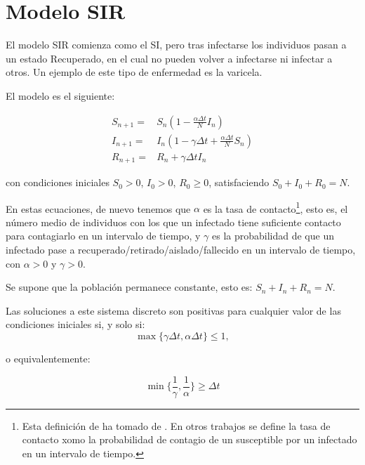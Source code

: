 \section{Modelo SIR}
El modelo SIR comienza como el SI, pero tras infectarse los individuos pasan a un estado Recuperado, en el cual no pueden volver a infectarse ni infectar a otros.
Un ejemplo de este tipo de enfermedad es la varicela. 

El modelo es el siguiente:

\begin{equation}
\label{eqn: SIR_modelo}
\begin{aligned}
S_{n+1} = & S_n \left(1-\frac{\alpha\Delta t}{N} I_n \right) \\
I_{n+1} = & I_n \left( 1-\gamma \Delta t + \frac{\alpha\Delta t}{N} S_n \right) \\
R_{n+1} = & R_n + \gamma \Delta t I_n
\end{aligned}
\end{equation}

con condiciones iniciales $S_0>0$, $I_0>0$, $R_0\geq 0$, satisfaciendo $S_0+I_0+R_0=N$.

En estas ecuaciones, de nuevo tenemos que $\alpha$ es la tasa de contacto\footnote{Esta definición de ha tomado de \cite{allenDiscretetimeSISIR1994}. En otros trabajos se define la tasa de contacto xomo la probabilidad de contagio de un susceptible por un infectado en un intervalo de tiempo.}, esto es, el número medio de individuos con los que un infectado tiene suficiente contacto para contagiarlo en un intervalo de tiempo, y $\gamma$ es la probabilidad de que un infectado pase a recuperado/retirado/aislado/fallecido en un intervalo de tiempo, con $\alpha >0$ y $\gamma >0$.

Se supone que la población permanece constante, esto es: $S_n+I_n+R_n=N$.

\begin{proposition}
Las soluciones a este sistema discreto son positivas para cualquier valor de las condiciones iniciales si, y solo si:
$$\max{\big\{\gamma\Delta t, \alpha\Delta t\big\} } \leq 1,$$

o equivalentemente:

$$\min{\bigg\{ \frac{1}{\gamma}, \frac{1}{\alpha} \bigg\} } \geq \Delta t$$

\end{proposition}


